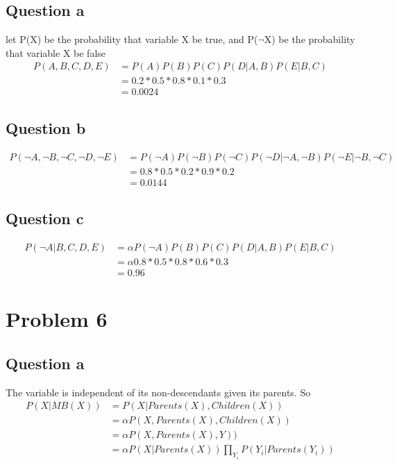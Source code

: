 \documentclass{article}
\begin{document}
\subsection{Question a}
let P(X) be the probability that variable X be true, and P($\neg$X) be the probability that variable X be false
\begin{align*}
P(A, B, C, D, E) &= P(A)P(B)P(C)P(D| A, B)P(E| B, C)\\
  &= 0.2 * 0.5 * 0.8 * 0.1 *0.3\\
  &= 0.0024
\end{align*}

\subsection{Question b}
\begin{align*}
P(\neg A, \neg B, \neg C, \neg D, \neg E) &= P(\neg A)P(\neg B)P(\neg C)P(\neg D| \neg A, \neg B) P(\neg E|\neg B, \neg C)\\
  &= 0.8 * 0.5 * 0.2 * 0.9 *0.2\\
  &= 0.0144
\end{align*}

\subsection{Question c}
\begin{align*}
P(\neg A| B, C, D, E) &=  \alpha P(\neg A)P(B)P(C)P(D| A, B)P(E|B, C)\\
  &= \alpha  0.8 * 0.5 * 0.8 * 0.6 *0.3\\
  &= 0.96
\end{align*}



\section{Problem 6}
\subsection{Question a}
The variable is independent of its non-descendants given its parents. So
\begin{align*}
P(X | MB(X)) &= P(X | Parents(X), Children(X)) \\
	&= \alpha P(X, Parents(X), Children(X)) \\
	&= \alpha P(X, Parents(X), Y)) \\
	&= \alpha P(X| Parents(X)) \prod_{Y_i} P(Y_i | Parents(Y_i))
\end{align*}
\end{document}
